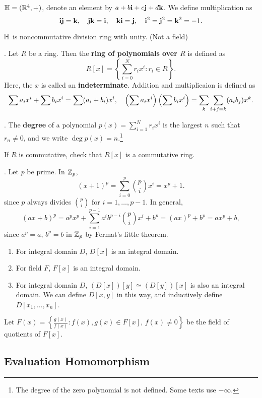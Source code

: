 \(\bb{H} = (\R^4, +)\), denote an element by \(a + b\bf{i} + c\bf{j} + d\bf{k}\). We define multiplication as
\[
    \bf{ij = k},\quad \bf{jk = i},\quad \bf{ki = j},\quad \bf{i}^2 = \bf{j}^2 = \bf{k}^2 = -1.
\]

\(\bb{H}\) is noncommutative division ring with unity. (Not a field)

\setcounter{topic}{21}

.  Let \(R\) be a ring. Then the \textbf{ring of polynomials over \(R\)} is defined as
\[
    R[x] = \left\{\sum_{i=0}^N r_ix^i : r_i \in R \right\}.
\]
Here, the \(x\) is called an \textbf{indeterminate}. Addition and multiplicaion is defined as
\[
    \sum a_i x^i + \sum b_i x^i = \sum (a_i + b_i) x^i, \quad \paren{\sum a_i x^i} \paren{\sum b_i x^i} = \sum_k \sum_{i + j = k} (a_i b_j) x^k.
\]

.  The \textbf{degree} of a polynomial \(p(x) = \sum_{i=1}^N r_i x^i\) is the largest \(n\) such that \(r_n \neq 0\), and we write \(\deg p(x) = n\).\footnote{The degree of the zero polynomial is not defined. Some texts use \(-\infty\).}

\rmk If \(R\) is commutative, check that \(R[x]\) is a commutative ring.

\ex. Let \(p\) be prime. In \(\Z_p\),
\[
    (x + 1)^p = \sum_{i=0}^p {p \choose i} x^i = x^p + 1.
\]
since \(p\) always divides \({p \choose i}\) for \(i = 1, \dots, p - 1\). In general,
\[
    (ax + b)^p = a^px^p + \sum_{i=1}^{p-1} a^ib^{p-i}{p \choose i} x^i + b^p = (ax)^p + b^p = ax^p + b,
\]
since \(a^p = a\), \(b^p = b\) in \(\Z_p\) by Fermat's little theorem.

\rmk
\begin{enumerate}
    \item For integral domain \(D\), \(D[x]\) is an integral domain.
    \item For field \(F\), \(F[x]\) is an integral domain.
    \item For integral domain \(D\), \((D[x])[y] \simeq (D[y])[x]\) is also an integral domain. We can define \(D[x, y]\) in this way, and inductively define \(D[x_1, \dots, x_n]\).
\end{enumerate}

\notation Let \(F(x) = \left\{\frac{g(x)}{f(x)} : f(x), g(x) \in F[x],\, f(x) \neq 0\right\}\) be the field of quotients of \(F[x]\).

\subsection*{Evaluation Homomorphism}

